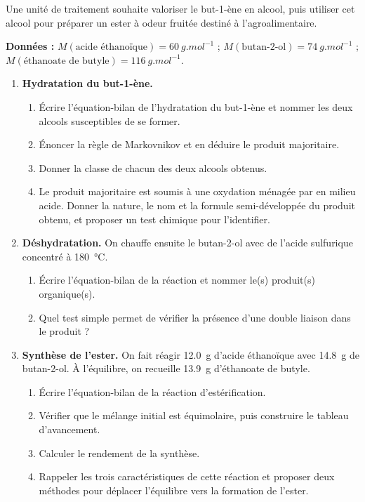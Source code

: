 \documentclass[11pt]{article}
\begin{document}
\begin{exercice}
Une unité de traitement souhaite valoriser le but-1-ène en alcool, puis utiliser cet alcool pour préparer un ester à odeur fruitée destiné à l'agroalimentaire.
\par\textbf{Données :} $M(\text{acide éthanoïque}) = \SI{60}{g.mol^{-1}}$ ; $M(\text{butan-2-ol}) = \SI{74}{g.mol^{-1}}$ ; $M(\text{éthanoate de butyle}) = \SI{116}{g.mol^{-1}}$.
\begin{enumerate}
\item \textbf{Hydratation du but-1-ène.}
\begin{enumerate}
\item Écrire l'équation-bilan de l'hydratation du but-1-ène et nommer les deux alcools susceptibles de se former.
\item Énoncer la règle de Markovnikov et en déduire le produit majoritaire.
\item Donner la classe de chacun des deux alcools obtenus.
\item Le produit majoritaire est soumis à une oxydation ménagée par  en milieu acide. Donner la nature, le nom et la formule semi-développée du produit obtenu, et proposer un test chimique pour l'identifier.
\end{enumerate}
\item \textbf{Déshydratation.} On chauffe ensuite le butan-2-ol avec de l'acide sulfurique concentré à \SI{180}{\celsius}.
\begin{enumerate}
\item Écrire l'équation-bilan de la réaction et nommer le(s) produit(s) organique(s).
\item Quel test simple permet de vérifier la présence d'une double liaison dans le produit ?
\end{enumerate}
\item \textbf{Synthèse de l'ester.} On fait réagir \SI{12,0}{g} d'acide éthanoïque avec \SI{14,8}{g} de butan-2-ol. À l'équilibre, on recueille \SI{13,9}{g} d'éthanoate de butyle.
\begin{enumerate}
\item Écrire l'équation-bilan de la réaction d'estérification.
\item Vérifier que le mélange initial est équimolaire, puis construire le tableau d'avancement.
\item Calculer le rendement de la synthèse.
\item Rappeler les trois caractéristiques de cette réaction et proposer deux méthodes pour déplacer l'équilibre vers la formation de l'ester.
\end{enumerate}
\end{enumerate}
\end{exercice}
\end{document}
